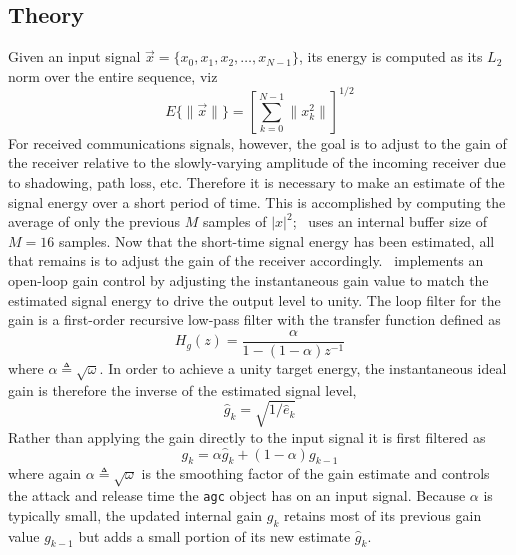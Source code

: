 \subsection{Theory}
\label{module:agc:theory}
Given an input signal
$\vec{x} = \{ x_0, x_1, x_2, \ldots, x_{N-1} \}$,
its energy is computed as its $L_2$ norm over the entire sequence, viz
\begin{equation}
\label{eqn:agc:energy}
    E\{ \|\vec{x}\| \} = 
        \left[
            \sum\limits_{k=0}^{N-1} {\|x_k^2\|}
        \right]^{1/2}
\end{equation}
For received communications signals, however, the goal is to adjust to the
gain of the receiver relative to the slowly-varying amplitude of the incoming
receiver due to shadowing, path loss, etc.
Therefore it is necessary to make an estimate of the signal energy over
a short period of time.
This is accomplished by computing the average of only the previous $M$
samples of $|x|^2$; \liquid\ uses an internal buffer size of $M=16$
samples.
Now that the short-time signal energy has been estimated, all that remains is to
adjust the gain of the receiver accordingly.
\liquid\ implements an open-loop gain control by adjusting the
instantaneous gain value to match the estimated signal energy to drive
the output level to unity.
The loop filter for the gain is a first-order recursive low-pass filter
with the transfer function defined as
%
\begin{equation}
\label{eqn:agc:loop_filter}
    H_g(z) =
        \frac{
            \alpha
        }{
            1 - (1-\alpha) z^{-1}
        }
\end{equation}
%
where $\alpha \triangleq \sqrt{\omega}$.
%
In order to achieve a unity target energy, the instantaneous ideal gain is
therefore the inverse of the estimated signal level,
%
\begin{equation}
\label{eqn:agc:default:ghat}
    \hat{g}_{k} = \sqrt{1 / \hat{e}_k}
\end{equation}
%
Rather than applying the gain directly to the input signal it is first
filtered as
%
\begin{equation}
\label{eqn:agc:default:g}
    g_{k} = \alpha \hat{g}_{k} + (1-\alpha) g_{k-1}
\end{equation}
%
where again $\alpha \triangleq \sqrt{\omega}$ is the smoothing factor of
the gain estimate and controls the attack and release time the {\tt agc}
object has on an input signal.
Because $\alpha$ is typically small, the updated internal gain $g_{k}$
retains most of its previous gain value $g_{k-1}$ but adds a small
portion of its new estimate $\hat{g}_{k}$.


